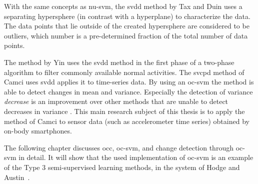 With the same concepts as \gls{nu-svm}, the \gls{svdd} method by Tax and Duin \cite{tax1999support,tax2004support} uses a separating hypersphere (in contrast with a hyperplane) to characterize the data.
The data points that lie outside of the created hypersphere are considered to be outliers, which number is a pre-determined fraction of the total number of data points.

The method by Yin \etal \cite{yin2008sensor} uses the \gls{svdd} method in the first phase of a two-phase algorithm to filter commonly available normal activities.
The \gls{svcpd} method of Camci \cite{camci2010change} uses \gls{svdd} applies it to time-series data.
By using an \gls{oc-svm} the method is able to detect changes in mean and variance.
Especially the detection of variance \emph{decrease} is an improvement over other methods that
are unable to detect decreases in variance \cite{takeuchi2006unifying}.
This main research subject of this thesis is to apply the method of Camci \cite{camci2010change} to sensor data (such as accelerometer time series) obtained by on-body smartphones.

The following chapter discusses \gls{occ}, \gls{oc-svm}, and change detection through \gls{oc-svm} in detail.
It will show that the used implementation of \gls{oc-svm} is an example of the Type 3 semi-supervised learning methods, in the system of Hodge and Austin~\cite{hodge2004survey}.



